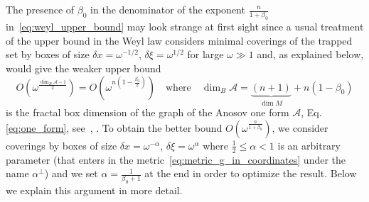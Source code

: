 \documentclass[AHL,Unicode,longabstracts,published]{cedram}
\newcommand{\scrA}{\mathscr{A}}
\begin{document}
The presence of $\beta_{0}$ in the denominator of the exponent $\frac{n}{1+\beta_{0}}$ in~\eqref{eq:weyl_upper_bound} may look strange at first sight since a usual treatment of the upper bound in the Weyl law considers minimal coverings of the trapped set by boxes of size $\delta x=\omega^{-1/2}$, $\delta\xi=\omega^{1/2}$ for large $\omega\gg1$ and, as explained below, would give the weaker upper bound 
\[
O\left(\omega^{\frac{\dim_{B}\scrA-1}{2}}\right)=O\left(\omega^{n\left(1-\frac{\beta_{0}}{2}\right)}\right)\quad\text{where}\quad\dim_{B}\scrA=\underbrace{(n+1)}_{\dim M}+n(1-\beta_{0})
\]
is the fractal box dimension of the graph of the Anosov one form $\scrA$, Eq.\eqref{eq:one_form}, see~\cite[Chap.~11]{falconer_03_book}, \cite{Nonnenmacher_Zworski_14}. To obtain the better bound $O(\omega^{\frac{n}{1+\beta_{0}}})$, we consider coverings by boxes of size $\delta x=\omega^{-\alpha}$, $\delta\xi=\omega^{\alpha}$ where $\frac{1}{2}\leq\alpha<1$ is an arbitrary parameter (that enters in the metric~\eqref{eq:metric_g_in_coordinates} under the name $\alpha^{\perp}$) and we set $\alpha=\frac{1}{\beta_{0}+1}$ at the end in order to optimize the result. Below we explain this argument in more detail.
\end{document}
